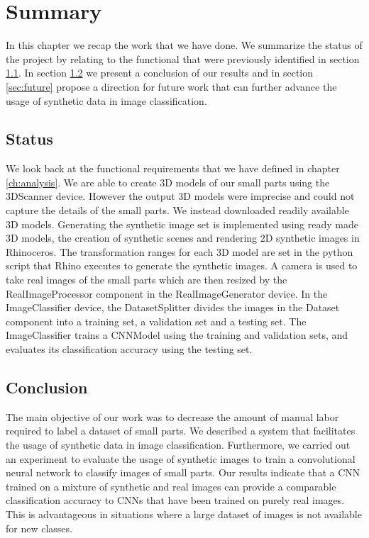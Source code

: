 \chapter{Summary}\label{ch:summary}

In this chapter we recap the work that we have done. We summarize the status of the project by relating to the functional that were previously identified in section \ref{sec:status}. In section \ref{sec:conclusion} we present a conclusion of our results and in section \ref{sec:future} propose a direction for future work that can further advance the usage of synthetic data in image classification.


\section{Status}\label{sec:status}

We look back at the functional requirements that we have defined in chapter \ref{ch:analysis}. We are able to create 3D models of our small parts using the 3DScanner device. However the output 3D models were imprecise and could not capture the details of the small parts. We instead downloaded readily available 3D models. Generating the synthetic image set is implemented using ready made 3D models, the creation of synthetic scenes and rendering 2D synthetic images in Rhinoceros. The transformation ranges for each 3D model are set in the python script that Rhino executes to generate the synthetic images. A camera is used to take real images of the small parts which are then resized by the RealImageProcessor component in the RealImageGenerator device. In the ImageClassifier device, the DatasetSplitter divides the images in the Dataset component into a training set, a validation set and a testing set. The ImageClassifier trains a CNNModel using the training and validation sets, and evaluates its classification accuracy using the testing set.


\section{Conclusion}\label{sec:conclusion}

The main objective of our work was to decrease the amount of manual labor required to label a dataset of small parts. We described a system that facilitates the usage of synthetic data in image classification. Furthermore, we carried out an experiment to evaluate the usage of synthetic images to train a convolutional neural network to classify images of small parts. Our results indicate that a CNN trained on a mixture of synthetic and real images can provide a comparable classification accuracy to CNNs that have been trained on purely real images. This is advantageous in situations where a large dataset of images is not available for new classes.


